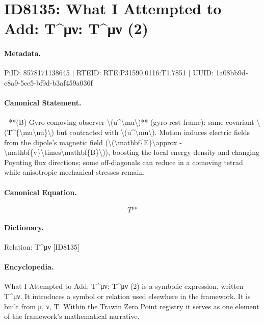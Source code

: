 \section*{ID8135: What I Attempted to Add: T\textasciicircum{}μν: T\textasciicircum{}μν (2)}
\paragraph{Metadata.}
PiID: 8578171138645 | RTEID: RTE:P31590.0116:T1.7851 | UUID: 1a08bb9d-e8a9-5ce5-bf9d-b3af459a036f

\paragraph{Canonical Statement.}
- **(B) Gyro comoving observer \textbackslash{}(u\textasciicircum{}\textbackslash{}mu\textbackslash{})** (gyro rest frame): same covariant \textbackslash{}(T\textasciicircum{}\{\textbackslash{}mu\textbackslash{}nu\}\textbackslash{}) but contracted with \textbackslash{}(u\textasciicircum{}\textbackslash{}mu\textbackslash{}). Motion induces electric fields from the dipole’s magnetic field (\textbackslash{}(\textbackslash{}mathbf\{E\}\textbackslash{}approx -\textbackslash{}mathbf\{v\}\textbackslash{}times\textbackslash{}mathbf\{B\}\textbackslash{})), boosting the local energy density and changing Poynting flux directions; some off-diagonals can reduce in a comoving tetrad while anisotropic mechanical stresses remain.

\paragraph{Canonical Equation.}
\[
T^{\mu\nu}
\]

\paragraph{Dictionary.}
Relation: T\textasciicircum{}μν [ID8135]

\paragraph{Encyclopedia.}
What I Attempted to Add: T\textasciicircum{}μν: T\textasciicircum{}μν (2) is a symbolic expression, written T\textasciicircum{}μν. It introduces a symbol or relation used elsewhere in the framework. It is built from μ, ν, T. Within the Trawin Zero Point registry it serves as one element of the framework's mathematical narrative.
